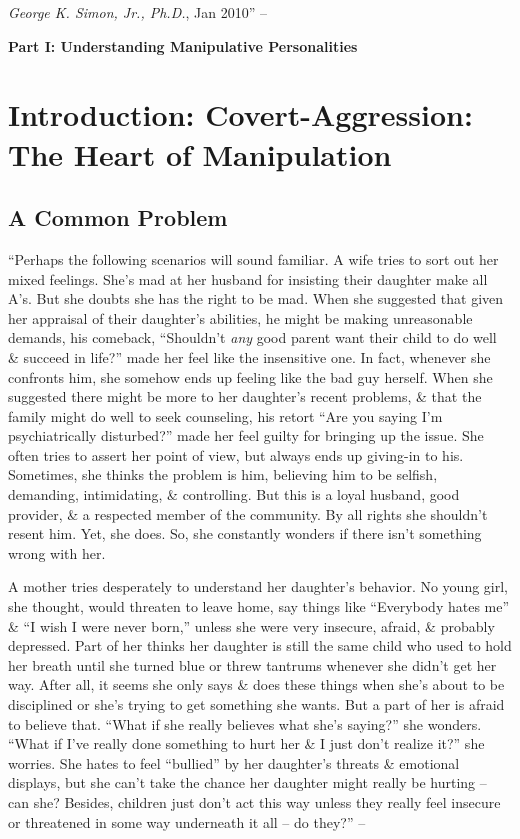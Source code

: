 \documentclass{article}
\numberwithin{equation}{section}
\begin{document}
\textit{George K. Simon, Jr., Ph.D.}, Jan 2010'' -- \cite[p. 14]{Simon2010}


\begin{center}\LARGE\sf
	\textbf{Part I: Understanding Manipulative Personalities}
\end{center}

\section*{Introduction: Covert-Aggression: The Heart of Manipulation}

\subsection{A Common Problem}
``Perhaps the following scenarios will sound familiar. A wife tries to sort out her mixed feelings. She's mad at her husband for insisting their daughter make all A's. But she doubts she has the right to be mad. When she suggested that given her appraisal of their daughter's abilities, he might be making unreasonable demands, his comeback, ``Shouldn't \textit{any} good parent want their child to do well \& succeed in life?'' made her feel like the insensitive one. In fact, whenever she confronts him, she somehow ends up feeling like the bad guy herself. When she suggested there might be more to her daughter's recent problems, \& that the family might do well to seek counseling, his retort ``Are you saying I'm psychiatrically disturbed?'' made her feel guilty for bringing up the issue. She often tries to assert her point of view, but always ends up giving-in to his. Sometimes, she thinks the problem is him, believing him to be selfish, demanding, intimidating, \& controlling. But this is a loyal husband, good provider, \& a respected member of the community. By all rights she shouldn't resent him. Yet, she does. So, she constantly wonders if there isn't something wrong with her.

A mother tries desperately to understand her daughter's behavior. No young girl, she thought, would threaten to leave home, say things like ``Everybody hates me'' \& ``I wish I were never born,'' unless she were very insecure, afraid, \& probably depressed. Part of her thinks her daughter is still the same child who used to hold her breath until she turned blue or threw tantrums whenever she didn't get her way. After all, it seems she only says \& does these things when she's about to be disciplined or she's trying to get something she wants. But a part of her is afraid to believe that. ``What if she really believes what she's saying?'' she wonders. ``What if I've really done something to hurt her \& I just don't realize it?'' she worries. She hates to feel ``bullied'' by her daughter's threats \& emotional displays, but she can't take the chance her daughter might really be hurting -- can she? Besides, children just don't act this way unless they really feel insecure or threatened in some way underneath it all -- do they?'' -- \cite[pp. 17--18]{Simon2010}
\end{document}
